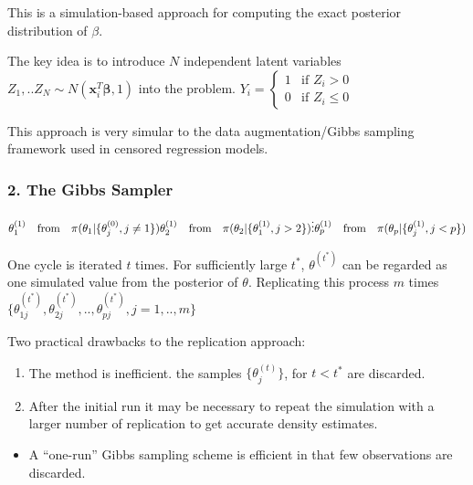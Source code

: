 \documentclass[
]{article}
\providecommand{\tightlist}{%
  \setlength{\itemsep}{0pt}\setlength{\parskip}{0pt}}
\begin{document}
This is a simulation-based approach for computing the exact posterior
distribution of \(\beta\).

The key idea is to introduce \(N\) independent latent variables
\(Z_1,..Z_N\sim N(\mathbf{x}_i^T\boldsymbol{\beta},1)\) into the
problem.
\(Y_i=\begin{cases}1&\text{if } Z_i>0\\0&\text{if }Z_i\le0\end{cases}\)

This approach is very simular to the data augmentation/Gibbs sampling
framework used in censored regression models.

\hypertarget{the-gibbs-sampler}{%
\subsubsection{2. The Gibbs Sampler}\label{the-gibbs-sampler}}

\(\theta_1^{(1)}\quad\text{from}\quad\pi(\theta_1|\{\theta_j^{(0)},j\neq1\})\\ \theta_2^{(1)}\quad\text{from}\quad\pi(\theta_2|\{\theta_1^{(1)},j>2\})\\ \vdots\\ \theta_p^{(1)}\quad\text{from}\quad\pi(\theta_p|\{\theta_j^{(1)},j<p\})\\ \)

One cycle is iterated \(t\) times. For sufficiently large \(t^*\),
\(\theta^{(t^*)}\) can be regarded as one simulated value from the
posterior of \(\theta\). Replicating this process \(m\) times
\(\{\theta_{1j}^{(t^*)},\theta_{2j}^{(t^*)},..,\theta_{pj}^{(t^*)},j=1,..,m\}\)

Two practical drawbacks to the replication approach:

\begin{enumerate}
\def\labelenumi{\arabic{enumi}.}
\item
  The method is inefficient. the samples \(\{\theta_j^{(t)}\}\), for
  \(t<t^*\) are discarded.
\item
  After the initial run it may be necessary to repeat the simulation
  with a larger number of replication to get accurate density estimates.
\end{enumerate}

\begin{itemize}
\tightlist
\item
  A ``one-run'' Gibbs sampling scheme is efficient in that few
  observations are discarded.
\end{itemize}
\end{document}
